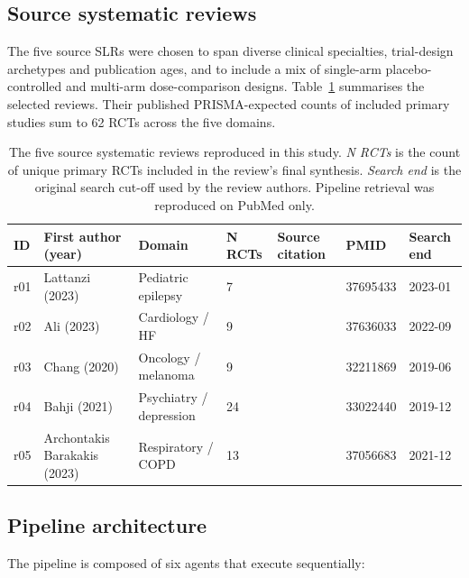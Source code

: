 \documentclass[a4paper,fleqn]{cas-sc}
\begin{document}
\subsection{Source systematic reviews}

The five source SLRs were chosen to span diverse clinical specialties,
trial-design archetypes and publication ages, and to include a mix of
single-arm placebo-controlled and multi-arm dose-comparison designs.
Table~\ref{tbl:sources} summarises the selected reviews. Their published
PRISMA-expected counts of included primary studies sum to 62 RCTs across
the five domains.

\begin{table}[t]
\caption{The five source systematic reviews reproduced in this study.
\textit{N RCTs} is the count of unique primary RCTs included in the
review's final synthesis. \textit{Search end} is the original search
cut-off used by the review authors. Pipeline retrieval was reproduced
on PubMed only.}
\label{tbl:sources}
\begin{tabular*}{\tblwidth}{@{}p{0.6cm}p{2.6cm}p{2.6cm}p{0.7cm}p{6.5cm}p{1.6cm}p{1.4cm}@{}}
\toprule
ID & First author (year) & Domain & N RCTs & Source citation & PMID & Search end \\
\midrule
r01 & Lattanzi (2023)             & Pediatric epilepsy   & 7  & \citet{lattanzi2023dravet}      & 37695433 & 2023-01 \\
r02 & Ali (2023)                  & Cardiology / HF      & 9  & \citet{ali2023dapagliflozin}    & 37636033 & 2022-09 \\
r03 & Chang (2020)                & Oncology / melanoma  & 9  & \citet{chang2020melanoma}       & 32211869 & 2019-06 \\
r04 & Bahji (2021)                & Psychiatry / depression & 24 & \citet{bahji2021ketamine}    & 33022440 & 2019-12 \\
r05 & Archontakis Barakakis (2023)& Respiratory / COPD   & 13 & \citet{archontakis2023ics}      & 37056683 & 2021-12 \\
\bottomrule
\end{tabular*}
\end{table}

\subsection{Pipeline architecture}\label{sec:methods:arch}

The pipeline is composed of six agents that execute sequentially:
\end{document}
